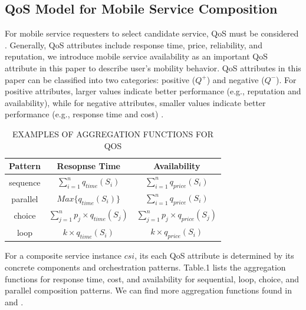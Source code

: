 \documentclass[10pt,journal,compsoc]{IEEEtran}
\begin{document}
\subsection{QoS Model for Mobile Service Composition}
For mobile service requesters to select candidate service, QoS must be considered \cite{wu2013predicting,luo2014efficient,luo2016generating}. Generally, QoS attributes include response time, price, reliability, and reputation, we introduce mobile service availability as an important QoS attribute in this paper to describe user's mobility behavior. QoS attributes in this paper can be classified into two categories: positive ($Q^+$) and negative ($Q^{-}$). For positive attributes, larger values indicate better performance (e.g., reputation and availability), while for negative attributes, smaller values indicate better performance (e.g., response time and cost) \cite{Wu2016}.	

\begin{table}[!t]
\renewcommand{\arraystretch}{1.3}
\caption{EXAMPLES OF AGGREGATION FUNCTIONS FOR QOS}
\label{table_example}
\centering
\begin{tabular}{ccc}
\hline
\bfseries Pattern & \bfseries Resopnse Time & \bfseries Availability \\
\hline
sequence & $\sum_{i=1}^{n}q_{time}(S_i)$ & $\sum_{i=1}^{n}q_{price}(S_i)$ \\
parallel & $Max\{q_{time}(S_i)\}$ & $\sum_{i=1}^{n}q_{price}(S_i)$ \\
choice & $\sum_{j=1}^{n} p_j \times q_{time}(S_j)$ & $\sum_{j=1}^{n} p_j \times q_{price}(S_j)$ \\
loop & $k \times q_{time}(S_i)$ & $k \times q_{price}(S_i)$ \\
\hline
\end{tabular}
\end{table}

For a composite service instance $csi$, its each QoS attribute is determined by its concrete components and orchestration patterns. Table.1 lists the aggregation functions for response time, cost, and availability for sequential, loop, choice, and parallel composition patterns. We can find more aggregation functions found in \cite{jaeger2004qos} and \cite{zheng2013qos}.
\end{document}
